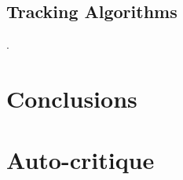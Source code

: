 \documentclass[pdftex,12pt,a4paper]{report}
\begin{document}
\section{Tracking Algorithms}
\label{sec:discussion_tracking_algs}.

\chapter{Conclusions}

\chapter*{Auto-critique}

\printbibliography[title={References}]

\end{document}
